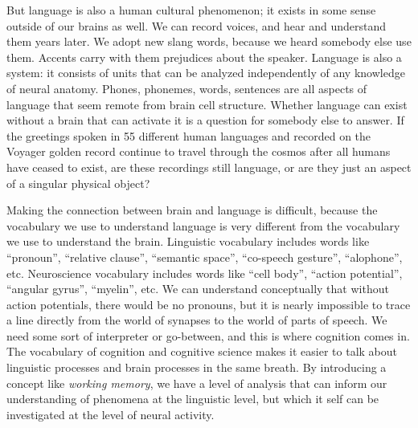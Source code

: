 \documentclass[
]{article}
\begin{document}
But language is also a human cultural phenomenon; it exists in some sense outside of our brains as well. We can record voices, and hear and understand them years later. We adopt new slang words, because we heard somebody else use them. Accents carry with them prejudices about the speaker. Language is also a system: it consists of units that can be analyzed independently of any knowledge of neural anatomy. Phones, phonemes, words, sentences are all aspects of language that seem remote from brain cell structure. Whether language can exist without a brain that can activate it is a question for somebody else to answer. If the greetings spoken in 55 different human languages and recorded on the Voyager golden record continue to travel through the cosmos after all humans have ceased to exist, are these recordings still language, or are they just an aspect of a singular physical object?

Making the connection between brain and language is difficult, because the vocabulary we use to understand language is very different from the vocabulary we use to understand the brain. Linguistic vocabulary includes words like ``pronoun'', ``relative clause'', ``semantic space'', ``co-speech gesture'', ``alophone'', etc. Neuroscience vocabulary includes words like ``cell body'', ``action potential'', ``angular gyrus'', ``myelin'', etc. We can understand conceptually that without action potentials, there would be no pronouns, but it is nearly impossible to trace a line directly from the world of synapses to the world of parts of speech. We need some sort of interpreter or go-between, and this is where cognition comes in. The vocabulary of cognition and cognitive science makes it easier to talk about linguistic processes and brain processes in the same breath. By introducing a concept like \emph{working memory}, we have a level of analysis that can inform our understanding of phenomena at the linguistic level, but which it self can be investigated at the level of neural activity.
\end{document}

